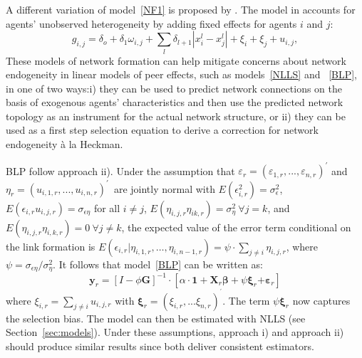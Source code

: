 \documentclass[nojss]{jss}
\begin{document}
	A different variation of model~\ref{NF1} is proposed by \cite{Graham:2016}. The model in \cite{Graham:2016} accounts for agents' unobserved heterogeneity by adding fixed effects for agents $i$ and $j$:
	\begin{equation}
	g_{i,j}=\delta _{o}+\delta _{1}\omega _{i,j}+\sum_{l}\delta
	_{l+1}|x_{i}^{l}-x_{j}^{l}|+\xi _{i}+\xi _{j}+u_{i,j},  \label{NF3}
	\end{equation}
	These models of network formation can help mitigate concerns about network endogeneity in linear models of peer effects, such as models~\ref{NLLS} and ~\ref{BLP}, in one of two ways:i) they can be used to predict network connections on the basis of exogenous agents' characteristics and then use the predicted network topology as an instrument for the actual network structure, or ii) they can be used as a first step selection equation to derive a correction for network endogeneity \`{a} la Heckman.
	
	BLP follow approach ii). Under the assumption that $\varepsilon _{r}=(\varepsilon _{1,r},...,\varepsilon _{n,r})^{\prime}$ and $\eta_{r}=(u_{i,1,r},...,u_{i,n,r})^{\prime}$\ are jointly
	normal with $E(\epsilon _{i,r}^{2})=\sigma _{\epsilon }^{2}$, $E(\epsilon_{i,r}u_{i,j,r})=\sigma _{\epsilon \eta }$ for all $i\neq j$, $E(\eta_{i,j,r}\eta _{ik,r})=\sigma _{\eta }^{2}\ \forall j=k$, and $E(\eta_{i,j,r}\eta _{i,k,r})=0\ \forall j\neq k$, the expected value of the error term conditional on the link formation is $E(\epsilon _{i,r}|\eta
	_{i,1,r},\dots ,\eta_{i,n-1,r})=\psi \cdot \sum_{j\neq i}\eta _{i,j,r}$, where $\psi =\sigma _{\epsilon \eta }/\sigma _{\eta }^{2}$. It follows that model~\ref{BLP} can be written as:
	\begin{equation}
	\mathbf{y}_{r}=\left[ I-\phi \boldsymbol{G}\right] ^{-1}\cdot \left[ \alpha
	\cdot \mathbf{1}+\boldsymbol{X}_{r}\mathbf{\beta +}\psi \mathbf{\xi }_{r}%
	\mathbf{+\varepsilon }_{r}\right]   \label{final_0}
	\end{equation}%
	where $\xi _{i,r}=\sum_{j\neq i}u_{i,j,r}$ with $\mathbf{\xi }_{r}=(\xi_{i,r},...\xi _{n,r})^{^{\prime }}$. The term $\psi \mathbf{\xi }_{r}$ now captures the selection bias. The model can then be estimated with NLLS (see Section~\ref{sec:models}).
	Under these assumptions, approach i) and approach ii) should produce similar results since both deliver consistent estimators.
	
\end{document}
